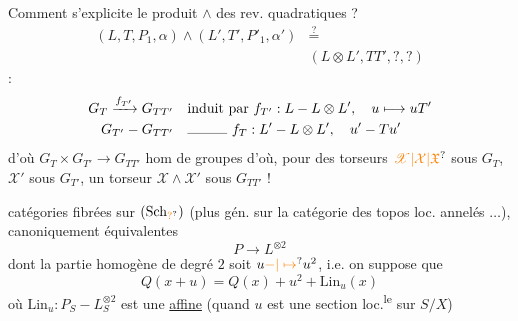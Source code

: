 Comment s'explicite le produit $\wedge$ des rev. quadratiques ?
\[
\begin{aligned}(L,T,P_1,\alpha)\wedge(L',T',P'_1,\alpha')&\overset?={}\\ &(L\otimes L',TT',?,?)\end{aligned}
\]
 :
\[
\begin{aligned}G_T\xrightarrow{f_{T'}}G_{TT'}&\quad\text{induit par } f_{T'}:L\mathbin{-}L\otimes L',\quad u\longmapsto uT'\\G_{T'}\mathbin{-}G_{TT'}&\quad\rule{1cm}{.3pt}\ f_T:L'\mathbin{-}L\otimes L',\quad u'\mathbin{-}Tu'\end{aligned}
\]
d'où $G_T\times G_{T'}\longrightarrow G_{TT'}$ hom de groupes d'où, pour des torseurs $\unsure{\mathscr X|\mathcal X|\mathfrak X}$ sous $G_T$, $\mathscr X'$ sous $G_{T'}$, un torseur $\mathscr X\wedge\mathscr X'$ sous $G_{TT'}$ !

  catégories fibrées sur $(\mathrm{Sch}_{\unsure{?}})$ (plus gén. sur la catégorie des topos loc. annelés $\ldots$), canoniquement équivalentes
\[
P\longrightarrow L^{\otimes2}
\]
dont la partie homogène de degré $2$ soit $u\unsure{\mathbin{-}|\mapsto}u^2$, i.e. on suppose que
\[
Q(x+u)=Q(x)+u^2+\mathrm{Lin}_u(x)
\]
où $\mathrm{Lin}_u:P_{S}\mathbin{-}L_S^{\otimes2}$ est une   \uline{affine} (quand $u$ est une section loc.\textsuperscript{le}  sur $S/X$)

